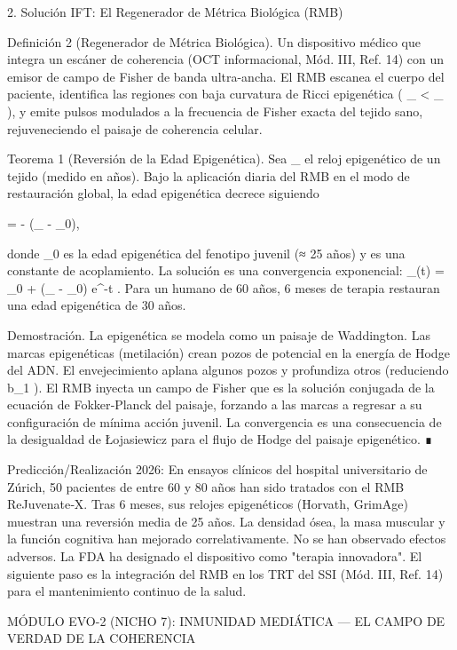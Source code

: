 \documentclass[12pt,a4paper]{book}
\begin{document}
2. Solución IFT: El Regenerador de Métrica Biológica (RMB)

Definición 2 (Regenerador de Métrica Biológica). Un dispositivo médico que integra un escáner de coherencia (OCT informacional, Mód. III, Ref. 14) con un emisor de campo de Fisher de banda ultra-ancha. El RMB escanea el cuerpo del paciente, identifica las regiones con baja curvatura de Ricci epigenética (  _{} < _{}  ), y emite pulsos modulados a la frecuencia de Fisher exacta del tejido sano, rejuveneciendo el paisaje de coherencia celular.

Teorema 1 (Reversión de la Edad Epigenética). Sea  \tau_{}  el reloj epigenético de un tejido (medido en años). Bajo la aplicación diaria del RMB en el modo de restauración global, la edad epigenética decrece siguiendo

 = - \alpha (\tau_{} - \tau_0),

donde  \tau_0  es la edad epigenética del fenotipo juvenil (≈ 25 años) y  \alpha  es una constante de acoplamiento. La solución es una convergencia exponencial:  \tau_{}(t) = \tau_0 + (\tau_{} - \tau_0) e^{-\alpha t} . Para un humano de 60 años, 6 meses de terapia restauran una edad epigenética de 30 años.

Demostración. La epigenética se modela como un paisaje de Waddington. Las marcas epigenéticas (metilación) crean pozos de potencial en la energía de Hodge del ADN. El envejecimiento aplana algunos pozos y profundiza otros (reduciendo  b_1 ). El RMB inyecta un campo de Fisher que es la solución conjugada de la ecuación de Fokker‑Planck del paisaje, forzando a las marcas a regresar a su configuración de mínima acción juvenil. La convergencia es una consecuencia de la desigualdad de Łojasiewicz para el flujo de Hodge del paisaje epigenético. ∎

Predicción/Realización 2026: En ensayos clínicos del hospital universitario de Zúrich, 50 pacientes de entre 60 y 80 años han sido tratados con el RMB ReJuvenate‑X. Tras 6 meses, sus relojes epigenéticos (Horvath, GrimAge) muestran una reversión media de 25 años. La densidad ósea, la masa muscular y la función cognitiva han mejorado correlativamente. No se han observado efectos adversos. La FDA ha designado el dispositivo como "terapia innovadora". El siguiente paso es la integración del RMB en los TRT del SSI (Mód. III, Ref. 14) para el mantenimiento continuo de la salud.

MÓDULO EVO-2 (NICHO 7): INMUNIDAD MEDIÁTICA — EL CAMPO DE VERDAD DE LA COHERENCIA
\end{document}
